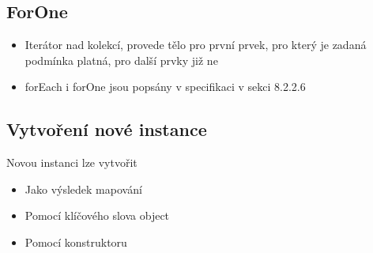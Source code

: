 \documentclass[11pt,a4paper]{article}   	%
\begin{document}
\subsection{ForOne}
\begin{itemize}
  	\item 	Iterátor nad kolekcí, provede tělo pro první prvek, pro který je
			zadaná podmínka platná, pro další prvky již ne
	\item	forEach i forOne jsou popsány v specifikaci v sekci 8.2.2.6
\end{itemize}

\subsection{Vytvoření nové instance}
Novou instanci lze vytvořit
\begin{itemize}
  \item		Jako výsledek mapování
  \item 	Pomocí klíčového slova object
  \item 	Pomocí konstruktoru
\end{itemize}
\end{document}
